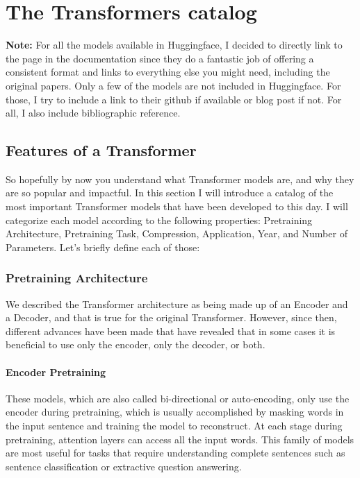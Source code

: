 \documentclass{article}
\begin{document}
\section{The Transformers catalog}

\textbf{Note:} For all the models available in Huggingface, I decided to directly link to the page in the documentation since they do a fantastic job of offering a consistent format and links to everything else you might need, including the original papers. Only a few of the models are not included in Huggingface. For those, I try to include a link to their github if available or blog post if not. For all, I also include bibliographic reference.


\subsection{Features of a Transformer}

So hopefully by now you understand what Transformer models are, and why they are so popular and impactful. In this section I will introduce a catalog of the most important Transformer models that have been developed to this day. I will categorize each model according to the following properties: Pretraining Architecture, Pretraining Task, Compression, Application, Year, and Number of Parameters. Let’s briefly define each of those:

\subsubsection{Pretraining Architecture}

We described the Transformer architecture as being made up of an Encoder and a Decoder, and that is true for the original Transformer. However, since then, different advances have been made that have revealed that in some cases it is beneficial to use only the encoder, only the decoder, or both.

\paragraph{Encoder Pretraining}

These models, which are also called bi-directional or auto-encoding, only use the encoder during pretraining, which is usually accomplished by masking words in the input sentence and training the model to reconstruct. At each stage during pretraining, attention layers can access all the input words. This family of models are most useful for tasks that require understanding complete sentences such as sentence classification or extractive question answering.
\end{document}
